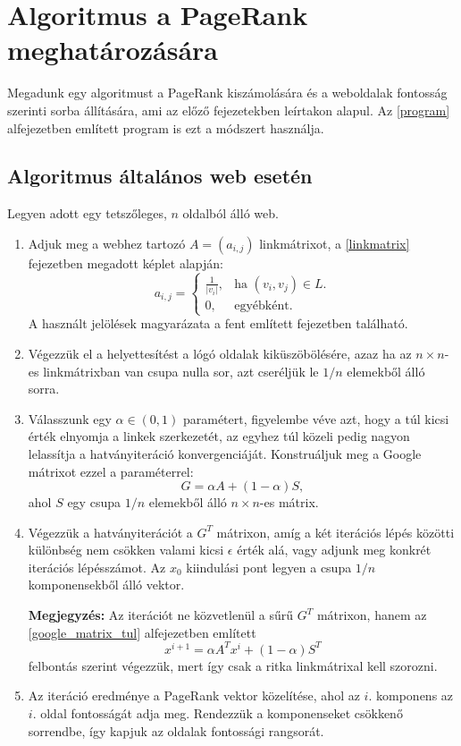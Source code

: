 \documentclass[12pt,a4paper]{article}
\begin{document}
\section{Algoritmus a PageRank meghatározására}

Megadunk egy algoritmust a PageRank kiszámolására és a weboldalak fontosság szerinti sorba állítására, ami az előző fejezetekben leírtakon alapul. Az \ref{program} alfejezetben említett program is ezt a módszert használja.

\subsection{Algoritmus általános web esetén}

Legyen adott egy tetszőleges, $n$ oldalból álló web.

\begin{enumerate}[label=(\Roman*)]
	\item Adjuk meg a webhez tartozó $A = (a_{i,j})$ linkmátrixot, a \ref{linkmatrix} fejezetben megadott képlet alapján: 
	\begin{equation*}
	a_{i,j}=\begin{cases}
	\frac{1}{ |v_i| }, & \text{ha $(v_i,v_j) \in L$}.\\
	0, & \text{egyébként}.
	\end{cases}
	\end{equation*}
	A használt jelölések magyarázata a fent említett fejezetben található.
	
	\item Végezzük el a helyettesítést a lógó oldalak kiküszöbölésére, azaz ha az $n \times n$-es linkmátrixban van csupa nulla sor, azt cseréljük le $1/n$ elemekből álló sorra.
	
	\item Válasszunk egy $\alpha \in (0,1)$ paramétert, figyelembe véve azt, hogy a túl kicsi érték elnyomja a linkek szerkezetét, az egyhez túl közeli pedig nagyon lelassítja a hatványiteráció konvergenciáját. Konstruáljuk meg a Google mátrixot ezzel a paraméterrel:
	\[G = \alpha A + (1-\alpha)S,\]
	ahol $S$ egy csupa $1/n$ elemekből álló $n \times n$-es mátrix. 
	
	\item Végezzük a hatványiterációt a $G^T$ mátrixon, amíg a két iterációs lépés közötti különbség nem csökken valami kicsi $\epsilon$ érték alá, vagy adjunk meg konkrét iterációs lépésszámot. Az $x_0$ kiindulási pont legyen a csupa $1/n$ komponensekből álló vektor.
	
	\textbf{Megjegyzés:} Az iterációt ne közvetlenül a sűrű $G^T$ mátrixon, hanem az \ref{google_matrix_tul} alfejezetben említett
	\[ x^{i+1} = \alpha A^T x^i + (1-\alpha) S^T \] 
	felbontás szerint végezzük, mert így csak a ritka linkmátrixal kell szorozni.
	
	\item Az iteráció eredménye a PageRank vektor közelítése, ahol az $i.$ komponens az $i.$ oldal fontosságát adja meg. Rendezzük a komponenseket csökkenő sorrendbe, így kapjuk az oldalak fontossági rangsorát.
	
\end{enumerate}
\end{document}
